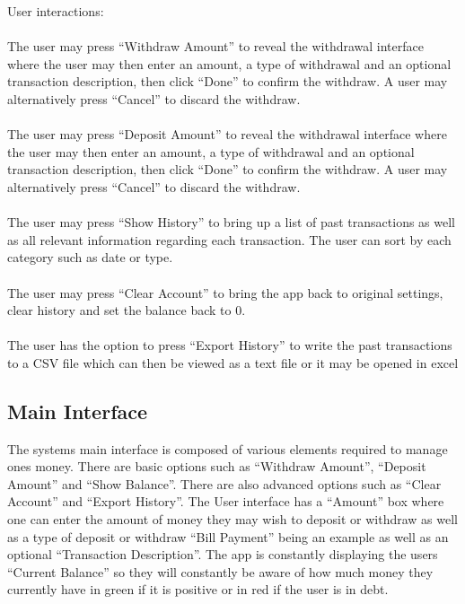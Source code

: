 \documentclass[12pt]{article}
\begin{document}
User interactions:\\ \\
The user may press “Withdraw Amount” to reveal the withdrawal interface where the user may then enter an amount, a type of withdrawal and an optional transaction description, then click “Done” to confirm the withdraw. A user may alternatively press “Cancel” to discard the withdraw.\\ \\
The user may press “Deposit Amount” to reveal the withdrawal interface where the user may then enter an amount, a type of withdrawal and an optional transaction description, then click “Done” to confirm the withdraw. A user may alternatively press “Cancel” to discard the withdraw.\\ \\
The user may press “Show History” to bring up a list of past transactions as well as all relevant information regarding each transaction. The user can sort by each category such as date or type.\\ \\
The user may press “Clear Account” to bring the app back to original settings, clear history and set the balance back to 0.\\ \\
The user has the option to press “Export History” to write the past transactions to a CSV file which can then be viewed as a text file or it may be opened in excel\\




\subsection{Main Interface}
The systems main interface is composed of various elements required to manage ones money.
There are basic options such as “Withdraw Amount”, “Deposit Amount” and “Show Balance”. There are also advanced options such as “Clear Account” and “Export History”. The User interface has a “Amount” box where one can enter the amount of money they may wish to deposit or withdraw as well as a type of deposit or withdraw “Bill Payment” being an example as well as an optional “Transaction Description”. The app is constantly displaying the users “Current Balance” so they will constantly be aware of how much money they currently have in green if it is positive or in red if the user is in debt.
\end{document}
